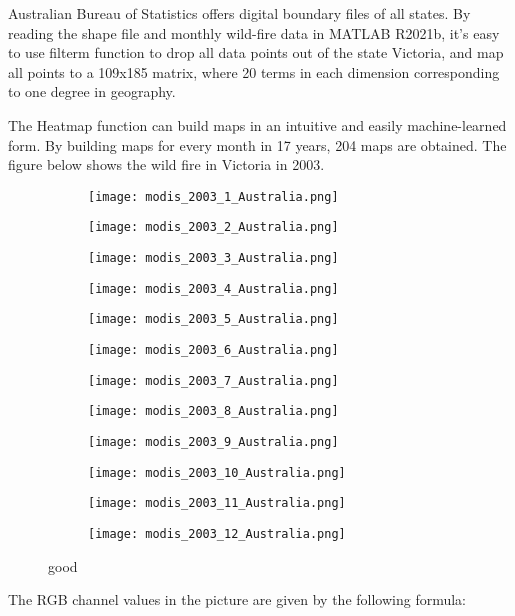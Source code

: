 \documentclass[../main]{subfiles}
\begin{document}
Australian Bureau of Statistics offers digital boundary files of all
states. By reading the shape file and monthly wild-fire data in MATLAB
R2021b, it's easy to use filterm function to drop all data points out of
the state Victoria, and map all points to a 109x185 matrix, where 20
terms in each dimension corresponding to one degree in geography.

The Heatmap function can build maps in an intuitive and easily
machine-learned form. By building maps for every month in 17 years, 204
maps are obtained. The figure below shows the wild fire in Victoria in
2003.

\begin{figure}[h!]
  \centering
\begin{subfigure}[b]{0.25\linewidth}
\texttt{[image: modis\_2003\_1\_Australia.png]}
\end{subfigure}
\begin{subfigure}[b]{0.25\linewidth}
\texttt{[image: modis\_2003\_2\_Australia.png]}
\end{subfigure}
\begin{subfigure}[b]{0.25\linewidth}
\texttt{[image: modis\_2003\_3\_Australia.png]}
\end{subfigure}
\begin{subfigure}[b]{0.25\linewidth}
\texttt{[image: modis\_2003\_4\_Australia.png]}
\end{subfigure}
\begin{subfigure}[b]{0.25\linewidth}
\texttt{[image: modis\_2003\_5\_Australia.png]}
\end{subfigure}
\begin{subfigure}[b]{0.25\linewidth}
\texttt{[image: modis\_2003\_6\_Australia.png]}
\end{subfigure}
\begin{subfigure}[b]{0.25\linewidth}
  \texttt{[image: modis\_2003\_7\_Australia.png]}
  \end{subfigure}
  \begin{subfigure}[b]{0.25\linewidth}
  \texttt{[image: modis\_2003\_8\_Australia.png]}
  \end{subfigure}
  \begin{subfigure}[b]{0.25\linewidth}
  \texttt{[image: modis\_2003\_9\_Australia.png]}
  \end{subfigure}
  \begin{subfigure}[b]{0.25\linewidth}
  \texttt{[image: modis\_2003\_10\_Australia.png]}
  \end{subfigure}
  \begin{subfigure}[b]{0.25\linewidth}
  \texttt{[image: modis\_2003\_11\_Australia.png]}
  \end{subfigure}
  \begin{subfigure}[b]{0.25\linewidth}
  \texttt{[image: modis\_2003\_12\_Australia.png]}
  \end{subfigure}
\caption{good}
  \label{fig:1-12}
\end{figure}
The RGB channel values in the picture are given by the following
formula:
\end{document}
